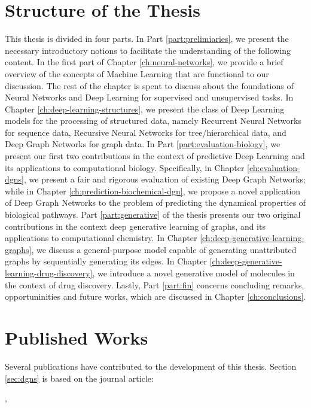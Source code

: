 \section{Structure of the Thesis}
This thesis is divided in four parts. In Part \ref{part:prelimiaries}, we present the necessary introductory notions to facilitate the understanding of the following content. In the first part of Chapter \ref{ch:neural-networks}, we provide a brief overview of the concepts of Machine Learning that are functional to our discussion. The rest of the chapter is spent to discuss about the foundations of Neural Networks and Deep Learning for supervised and unsupervised tasks. In Chapter \ref{ch:deep-learning-structures}, we present the class of Deep Learning models for the processing of structured data, namely Recurrent Neural Networks for sequence data, Recursive Neural Networks for tree/hierarchical data, and Deep Graph Networks for graph data. In Part \ref{part:evaluation-biology}, we present our first two contributions in the context of predictive Deep Learning and its applications to computational biology. Specifically, in Chapter \ref{ch:evaluation-dgns}, we present a fair and rigorous evaluation of existing Deep Graph Networks; while in Chapter \ref{ch:prediction-biochemical-dgn}, we propose a novel application of Deep Graph Networks to the problem of predicting the dynamical properties of biological pathways. Part \ref{part:generative} of the thesis presents our two original contributions in the context deep generative learning of graphs, and its applications to computational chemistry. In Chapter \ref{ch:deep-generative-learning-graphs}, we discuss a general-purpose  model capable of generating unattributed graphs by sequentially generating its edges. In Chapter \ref{ch:deep-generative-learning-drug-discovery}, we introduce a novel generative model of molecules in the context of drug discovery. Lastly, Part \ref{part:fin} concerns concluding remarks, opportuninities and future works, which are discussed in Chapter \ref{ch:conclusions}.

\section{Published Works}
Several publications have contributed to the development of this thesis. Section \ref{sec:dgns} is based on the journal article:

\vspace{1em}
,
\vspace{1em}

